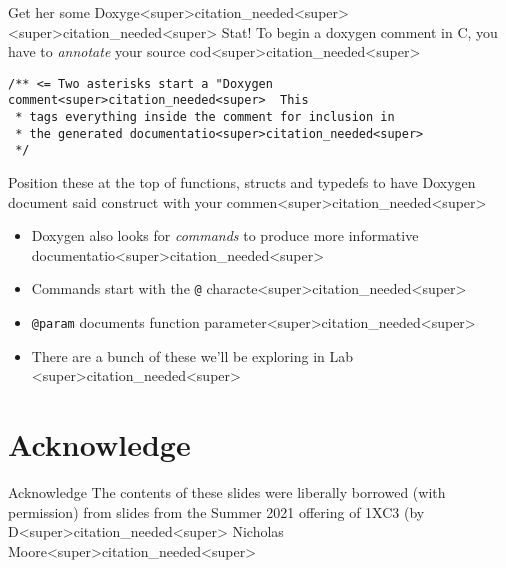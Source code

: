 \documentclass[11pt]{beamer}
\begin{document}
\begin{frame}[fragile=singleslide]{Get her some Doxyge<super>citation_needed<super><super>citation_needed<super> Stat!}
To begin a doxygen comment in C, you have to \textit{annotate} your source cod<super>citation_needed<super>
\begin{lstlisting}[style=C]
/** <= Two asterisks start a "Doxygen comment<super>citation_needed<super>  This 
 * tags everything inside the comment for inclusion in 
 * the generated documentatio<super>citation_needed<super>
 */
\end{lstlisting}
Position these at the top of functions, structs and typedefs to have Doxygen document said construct with your commen<super>citation_needed<super>  
\begin{itemize}
\item Doxygen also looks for \textit{commands} to produce more informative documentatio<super>citation_needed<super>
\item Commands start with the \texttt{@} characte<super>citation_needed<super> 
\item \texttt{@param} documents function parameter<super>citation_needed<super>  
\item There are a bunch of these we'll be exploring in Lab <super>citation_needed<super>  
\end{itemize}
\end{frame}

\section[Acknowledge]{Acknowledge}
\begin{frame}{Acknowledge}
\center
\vspace{8em}
The contents of these slides were liberally borrowed (with permission) from slides from the Summer 2021 offering of 1XC3 (by D<super>citation_needed<super> Nicholas Moore<super>citation_needed<super>  
\end{frame}



\end{document}
